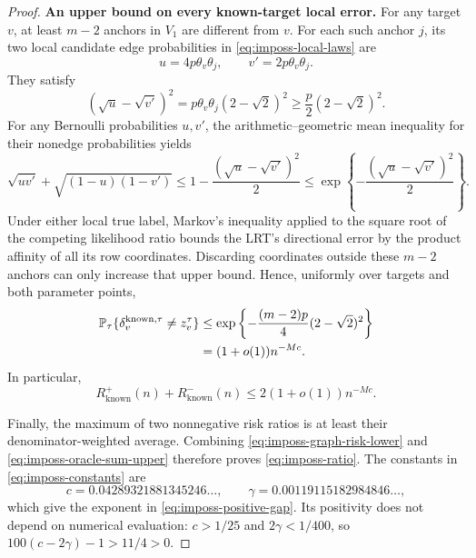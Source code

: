 \begin{proof}
\medskip
\textbf{An upper bound on every known-target local error.}
For any target \(v\), at least \(m-2\) anchors in \(V_1\) are different
from \(v\). For each such anchor \(j\), its two local candidate edge
probabilities in \eqref{eq:imposs-local-laws} are
\[
 u=4p\theta_v\theta_j,
 \qquad v'=2p\theta_v\theta_j.
\]
They satisfy
\[
 (\sqrt u-\sqrt{v'})^2
 =p\theta_v\theta_j(2-\sqrt2)^2
 \ge\frac p2(2-\sqrt2)^2.
\]
For any Bernoulli probabilities \(u,v'\), the arithmetic--geometric mean
inequality for their nonedge probabilities yields
\begin{equation}
 \sqrt{uv'}+\sqrt{(1-u)(1-v')}
 \le 1-\frac{(\sqrt u-\sqrt{v'})^2}{2}
 \le \exp\left\{-\frac{(\sqrt u-\sqrt{v'})^2}{2}\right\}.
 \label{eq:imposs-one-edge-upper}
\end{equation}
Under either local true label, Markov's inequality applied to the square
root of the competing likelihood ratio bounds the LRT's directional error
by the product affinity of all its row coordinates. Discarding coordinates
outside these \(m-2\) anchors can only increase that upper bound. Hence,
uniformly over targets and both parameter points,
\begin{align}
 \mathbb P_\tau\{\delta_v^{\mathrm{known},\tau}\ne z_v^\tau\}
 &\le\exp\left\{-\frac{(m-2)p}{4}(2-\sqrt2)^2\right\} \\
 &= (1+o(1))n^{-Mc}.
 \label{eq:imposs-oracle-upper}
\end{align}
In particular,
\begin{equation}
 R_{\mathrm{known}}^+(n)+R_{\mathrm{known}}^-(n)
 \le 2(1+o(1))n^{-Mc}.
 \label{eq:imposs-oracle-sum-upper}
\end{equation}

Finally, the maximum of two nonnegative risk ratios is at least their
denominator-weighted average. Combining
\eqref{eq:imposs-graph-risk-lower} and
\eqref{eq:imposs-oracle-sum-upper} therefore proves
\eqref{eq:imposs-ratio}. The constants in
\eqref{eq:imposs-constants} are
\[
 c=0.04289321881345246\ldots,
 \qquad \gamma=0.00119115182984846\ldots,
\]
which give the exponent in \eqref{eq:imposs-positive-gap}. Its positivity
does not depend on numerical evaluation: \(c>1/25\) and
\(2\gamma<1/400\), so \(100(c-2\gamma)-1>11/4>0\).
\end{proof}

